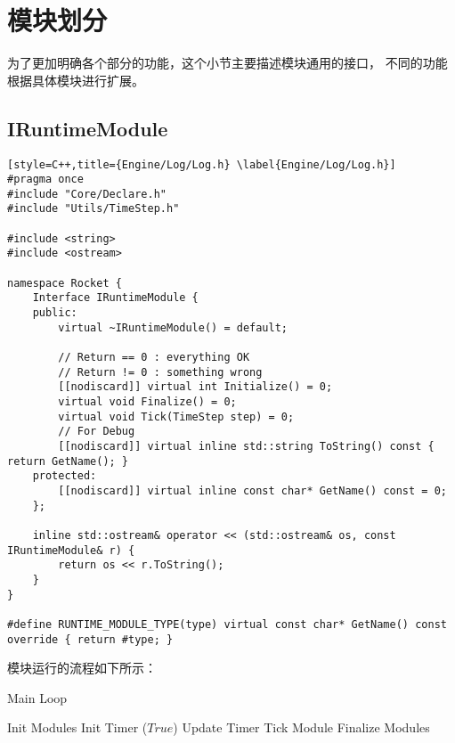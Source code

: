 \section{模块划分}

为了更加明确各个部分的功能，这个小节主要描述模块通用的接口，
不同的功能根据具体模块进行扩展。

\subsection{IRuntimeModule}

\begin{lstlisting}[style=C++,title={Engine/Log/Log.h} \label{Engine/Log/Log.h}]
#pragma once
#include "Core/Declare.h"
#include "Utils/TimeStep.h"

#include <string>
#include <ostream>

namespace Rocket {
    Interface IRuntimeModule {
    public:
        virtual ~IRuntimeModule() = default;

        // Return == 0 : everything OK
        // Return != 0 : something wrong
        [[nodiscard]] virtual int Initialize() = 0;
        virtual void Finalize() = 0;
        virtual void Tick(TimeStep step) = 0;
        // For Debug
        [[nodiscard]] virtual inline std::string ToString() const { return GetName(); }
    protected:
        [[nodiscard]] virtual inline const char* GetName() const = 0;
    };

    inline std::ostream& operator << (std::ostream& os, const IRuntimeModule& r) {
		return os << r.ToString();
	}
}

#define RUNTIME_MODULE_TYPE(type) virtual const char* GetName() const override { return #type; }
\end{lstlisting}

模块运行的流程如下所示：

\begin{breakablealgorithm}
\caption{Main Loop} \label{mainloop function}
\begin{algorithmic}
    \State Init Modules
    \State Init Timer
    \While($True$)
        \State Update Timer
        \State Tick Module
    \EndWhile
    \State Finalize Modules
\EndProcedure
\end{algorithmic}
\end{breakablealgorithm}
